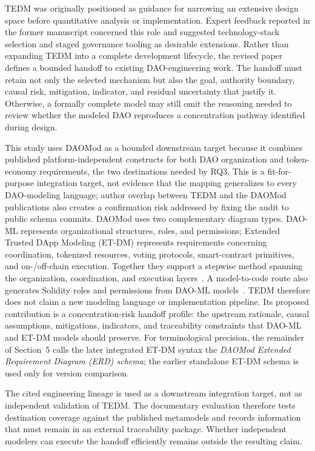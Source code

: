 \documentclass[referee,sn-basic]{sn-jnl}
\begin{document}
TEDM was originally positioned as guidance for narrowing an extensive design
space before quantitative analysis or implementation. Expert feedback reported
in the former manuscript concerned this role and suggested technology-stack
selection and staged governance tooling as desirable extensions. Rather than
expanding TEDM into a complete development lifecycle, the revised paper defines
a bounded handoff to existing DAO-engineering work. The handoff must retain not
only the selected mechanism but also the goal, authority boundary, causal risk,
mitigation, indicator, and residual uncertainty that justify it. Otherwise, a
formally complete model may still omit the reasoning needed to review whether
the modeled DAO reproduces a concentration pathway identified during design.

This study uses DAOMod as a bounded downstream target because it combines
published platform-independent constructs for both DAO organization and
token-economy requirements, the two destinations needed by RQ3. This is a
fit-for-purpose integration target, not evidence that the mapping generalizes
to every DAO-modeling language; author overlap between TEDM and the DAOMod
publications also creates a confirmation risk addressed by fixing the audit to
public schema commits. DAOMod uses two complementary diagram types. DAO-ML
represents organizational structures, roles, and permissions; Extended Trusted
DApp Modeling (ET-DM) represents requirements concerning coordination,
tokenized resources, voting protocols, smart-contract primitives, and
on-/off-chain execution. Together
they support a stepwise method spanning the organization, coordination, and
execution layers~\cite{Avanzo2024DAOML,Avanzo2025ExtendingTDM,
Avanzo2025Thesis,Avanzo2026DAOMod}. A model-to-code route also generates Solidity roles and
permissions from DAO-ML models~\cite{Avanzo2025DAOMLToSolidity}. TEDM therefore
does not claim a new modeling language or implementation pipeline. Its proposed
contribution is a concentration-risk handoff profile: the upstream rationale,
causal assumptions, mitigations, indicators, and traceability constraints that
DAO-ML and ET-DM models should preserve. For terminological precision, the
remainder of Section~5 calls the later integrated ET-DM syntax the \emph{DAOMod
Extended Requirement Diagram (ERD) schema}; the earlier standalone ET-DM
schema is used only for version comparison.

The cited engineering lineage is used as a downstream integration target, not
as independent validation of TEDM. The documentary evaluation therefore tests
destination coverage against the published metamodels and records information
that must remain in an external traceability package. Whether independent
modelers can execute the handoff efficiently remains outside the resulting
claim.
\end{document}
